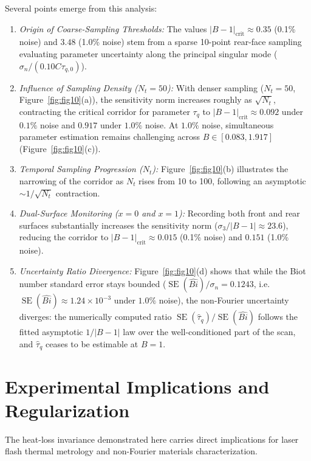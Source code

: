 \documentclass[preprint,12pt]{elsarticle}
\begin{document}
Several points emerge from this analysis:
\begin{enumerate}
    \item \textit{Origin of Coarse-Sampling Thresholds:} The values $|B - 1|_{\mathrm{crit}} \approx 0.35$ (0.1\% noise) and $3.48$ (1.0\% noise) stem from a sparse 10-point rear-face sampling evaluating parameter uncertainty along the principal singular mode ($\sigma_n / (0.10 C \tau_{q,0})$).
    \item \textit{Influence of Sampling Density ($N_t = 50$):} With denser sampling ($N_t = 50$, Figure~\ref{fig:fig10}(a)), the sensitivity norm increases roughly as $\sqrt{N_t}$, contracting the critical corridor for parameter $\tau_q$ to $|B - 1|_{\mathrm{crit}} \approx 0.092$ under $0.1\%$ noise and $0.917$ under $1.0\%$ noise. At $1.0\%$ noise, simultaneous parameter estimation remains challenging across $B \in [0.083, 1.917]$ (Figure~\ref{fig:fig10}(c)).
    \item \textit{Temporal Sampling Progression ($N_t$):} Figure~\ref{fig:fig10}(b) illustrates the narrowing of the corridor as $N_t$ rises from 10 to 100, following an asymptotic $\sim 1/\sqrt{N_t}$ contraction.
    \item \textit{Dual-Surface Monitoring ($x = 0$ and $x = 1$):} Recording both front and rear surfaces substantially increases the sensitivity norm ($\sigma_3/|B-1| \approx 23.6$), reducing the corridor to $|B - 1|_{\mathrm{crit}} \approx 0.015$ (0.1\% noise) and $0.151$ (1.0\% noise).
    \item \textit{Uncertainty Ratio Divergence:} Figure~\ref{fig:fig10}(d) shows that while the Biot number standard error stays bounded ($\operatorname{SE}(\hat{Bi})/\sigma_n = 0.1243$, i.e. $\operatorname{SE}(\hat{Bi}) \approx 1.24 \times 10^{-3}$ under $1.0\%$ noise), the non-Fourier uncertainty diverges: the numerically computed ratio $\operatorname{SE}(\hat{\tau}_q)/\operatorname{SE}(\hat{Bi})$ follows the fitted asymptotic $1/|B-1|$ law over the well-conditioned part of the scan, and $\hat{\tau}_q$ ceases to be estimable at $B = 1$.
\end{enumerate}

\section{Experimental Implications and Regularization}

The heat-loss invariance demonstrated here carries direct implications for laser flash thermal metrology and non-Fourier materials characterization.
\end{document}
